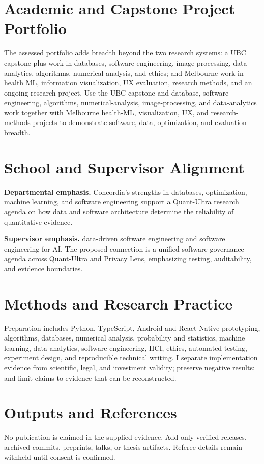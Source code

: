 \documentclass[11pt]{article}
\begin{document}
\section*{Academic and Capstone Project Portfolio}
The assessed portfolio adds breadth beyond the two research systems: a UBC capstone plus work in databases, software engineering, image processing, data analytics, algorithms, numerical analysis, and ethics; and Melbourne work in health ML, information visualization, UX evaluation, research methods, and an ongoing research project. Use the UBC capstone and database, software-engineering, algorithms, numerical-analysis, image-processing, and data-analytics work together with Melbourne health-ML, visualization, UX, and research-methods projects to demonstrate software, data, optimization, and evaluation breadth.

\section*{School and Supervisor Alignment}
\textbf{Departmental emphasis.} Concordia's strengths in databases, optimization, machine learning, and software engineering support a Quant-Ultra research agenda on how data and software architecture determine the reliability of quantitative evidence.

\textbf{Supervisor emphasis.} data-driven software engineering and software engineering for AI. The proposed connection is a unified software-governance agenda across Quant-Ultra and Privacy Lens, emphasizing testing, auditability, and evidence boundaries.

\section*{Methods and Research Practice}
Preparation includes Python, TypeScript, Android and React Native prototyping, algorithms, databases, numerical analysis, probability and statistics, machine learning, data analytics, software engineering, HCI, ethics, automated testing, experiment design, and reproducible technical writing. I separate implementation evidence from scientific, legal, and investment validity; preserve negative results; and limit claims to evidence that can be reconstructed.

\section*{Outputs and References}
No publication is claimed in the supplied evidence. Add only verified releases, archived commits, preprints, talks, or thesis artifacts. Referee details remain withheld until consent is confirmed.
\end{document}
